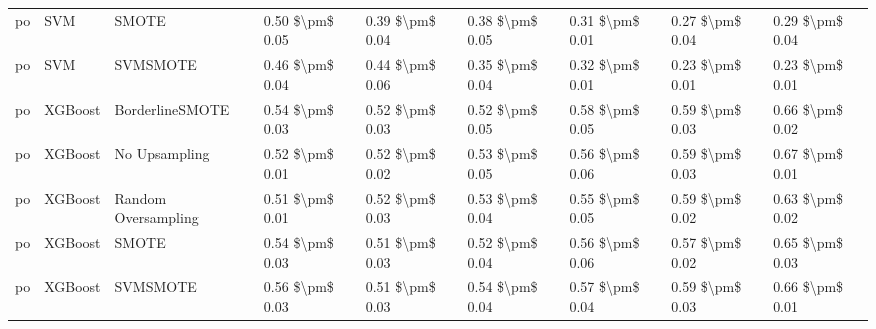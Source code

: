 \begin{tabular}{lllllllll}
      po &                             SVM &                         SMOTE & 0.50 \$\textbackslash pm\$ 0.05 &           0.39 \$\textbackslash pm\$ 0.04 &       0.38 \$\textbackslash pm\$ 0.05 &        0.31 \$\textbackslash pm\$ 0.01 &                         0.27 \$\textbackslash pm\$ 0.04 &     0.29 \$\textbackslash pm\$ 0.04 \\
      po &                             SVM &                      SVMSMOTE & 0.46 \$\textbackslash pm\$ 0.04 &           0.44 \$\textbackslash pm\$ 0.06 &       0.35 \$\textbackslash pm\$ 0.04 &        0.32 \$\textbackslash pm\$ 0.01 &                         0.23 \$\textbackslash pm\$ 0.01 &     0.23 \$\textbackslash pm\$ 0.01 \\
      po &                         XGBoost &               BorderlineSMOTE & 0.54 \$\textbackslash pm\$ 0.03 &           0.52 \$\textbackslash pm\$ 0.03 &       0.52 \$\textbackslash pm\$ 0.05 &        0.58 \$\textbackslash pm\$ 0.05 &                         0.59 \$\textbackslash pm\$ 0.03 &     0.66 \$\textbackslash pm\$ 0.02 \\
      po &                         XGBoost &                 No Upsampling & 0.52 \$\textbackslash pm\$ 0.01 &           0.52 \$\textbackslash pm\$ 0.02 &       0.53 \$\textbackslash pm\$ 0.05 &        0.56 \$\textbackslash pm\$ 0.06 &                         0.59 \$\textbackslash pm\$ 0.03 &     0.67 \$\textbackslash pm\$ 0.01 \\
      po &                         XGBoost &           Random Oversampling & 0.51 \$\textbackslash pm\$ 0.01 &           0.52 \$\textbackslash pm\$ 0.03 &       0.53 \$\textbackslash pm\$ 0.04 &        0.55 \$\textbackslash pm\$ 0.05 &                         0.59 \$\textbackslash pm\$ 0.02 &     0.63 \$\textbackslash pm\$ 0.02 \\
      po &                         XGBoost &                         SMOTE & 0.54 \$\textbackslash pm\$ 0.03 &           0.51 \$\textbackslash pm\$ 0.03 &       0.52 \$\textbackslash pm\$ 0.04 &        0.56 \$\textbackslash pm\$ 0.06 &                         0.57 \$\textbackslash pm\$ 0.02 &     0.65 \$\textbackslash pm\$ 0.03 \\
      po &                         XGBoost &                      SVMSMOTE & 0.56 \$\textbackslash pm\$ 0.03 &           0.51 \$\textbackslash pm\$ 0.03 &       0.54 \$\textbackslash pm\$ 0.04 &        0.57 \$\textbackslash pm\$ 0.04 &                         0.59 \$\textbackslash pm\$ 0.03 &     0.66 \$\textbackslash pm\$ 0.01 \\

\end{tabular}
